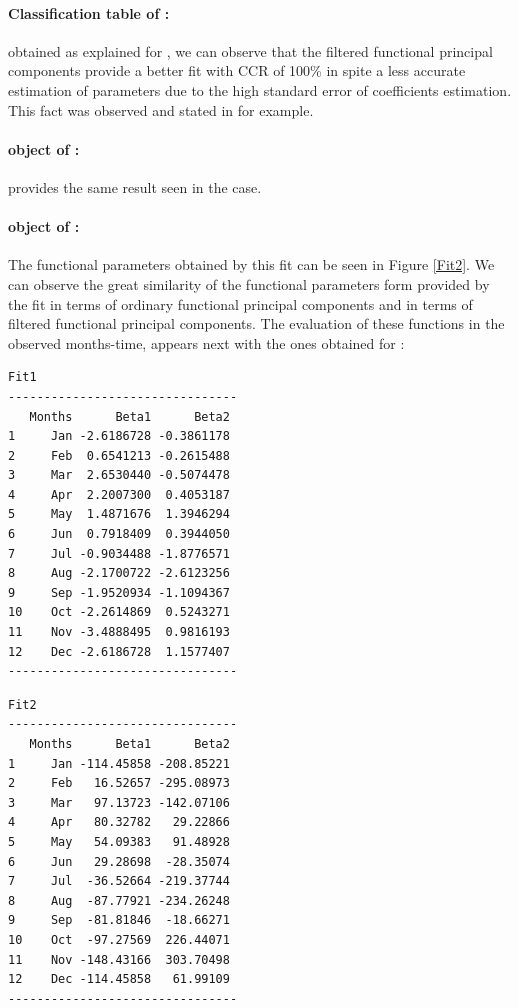 \paragraph{Classification table of :} obtained as explained for , we can observe that the filtered functional principal components provide a better fit with CCR of 100\% in spite a less accurate estimation of parameters due to the high standard error of coefficients estimation. This fact was observed and stated in \cite{Aguilera2008151} for example. 

\paragraph{ object of :} provides the same result seen in the  case.

\paragraph{ object of :} The functional parameters obtained by this fit can be seen in Figure \ref{Fit2}. We can observe the great similarity of the functional parameters form provided by the fit in terms of ordinary functional principal components and in terms of filtered functional principal components. The evaluation of these functions in the observed months-time, appears next with the ones obtained for :

\noindent
\begin{minipage}[t]{.49\textwidth}
\raggedleft
\begin{verbatim}
Fit1
--------------------------------
   Months      Beta1      Beta2
1     Jan -2.6186728 -0.3861178
2     Feb  0.6541213 -0.2615488
3     Mar  2.6530440 -0.5074478
4     Apr  2.2007300  0.4053187
5     May  1.4871676  1.3946294
6     Jun  0.7918409  0.3944050
7     Jul -0.9034488 -1.8776571
8     Aug -2.1700722 -2.6123256
9     Sep -1.9520934 -1.1094367
10    Oct -2.2614869  0.5243271
11    Nov -3.4888495  0.9816193
12    Dec -2.6186728  1.1577407
--------------------------------
\end{verbatim}
\end{minipage}%
%
\hfill
%
\begin{minipage}[t]{.49\textwidth}
\raggedleft
\begin{verbatim}
Fit2
--------------------------------
   Months      Beta1      Beta2
1     Jan -114.45858 -208.85221
2     Feb   16.52657 -295.08973
3     Mar   97.13723 -142.07106
4     Apr   80.32782   29.22866
5     May   54.09383   91.48928
6     Jun   29.28698  -28.35074
7     Jul  -36.52664 -219.37744
8     Aug  -87.77921 -234.26248
9     Sep  -81.81846  -18.66271
10    Oct  -97.27569  226.44071
11    Nov -148.43166  303.70498
12    Dec -114.45858   61.99109
--------------------------------
\end{verbatim}
\end{minipage}%
\label{BasisEval}

